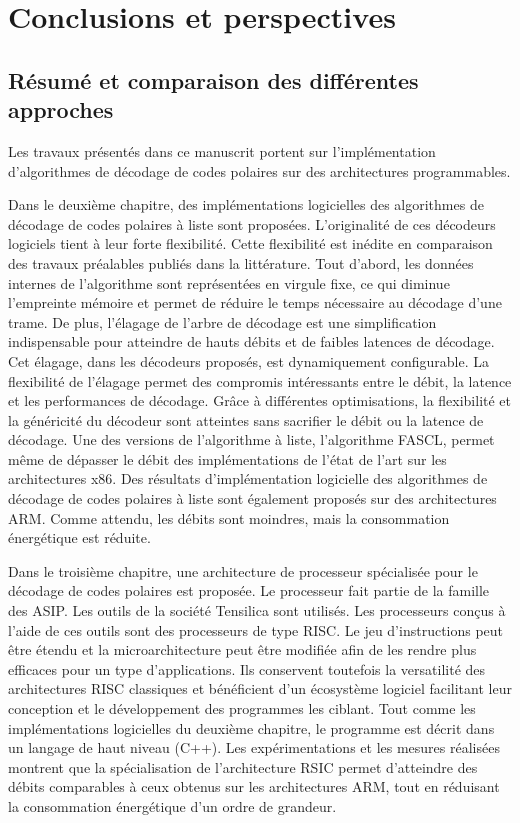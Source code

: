 \chapter*{Conclusions et perspectives}

\section*{Résumé et comparaison des différentes approches}

Les travaux présentés dans ce manuscrit portent sur l'implémentation d'algorithmes de décodage de codes polaires sur des architectures programmables.

Dans le deuxième chapitre, des implémentations logicielles des algorithmes de décodage de codes polaires à liste sont proposées. L'originalité de ces décodeurs logiciels tient à leur forte flexibilité. Cette flexibilité est inédite en comparaison des travaux préalables publiés dans la littérature. Tout d'abord, les données internes de l'algorithme sont représentées en virgule fixe, ce qui diminue l'empreinte mémoire et permet de réduire le temps nécessaire au décodage d'une trame. De plus, l'élagage de l'arbre de décodage est une simplification indispensable pour atteindre de hauts débits et de faibles latences de décodage. Cet élagage, dans les décodeurs proposés, est dynamiquement configurable. La flexibilité de l'élagage permet des compromis intéressants entre le débit, la latence et les performances de décodage. Grâce à différentes optimisations, la flexibilité et la généricité du décodeur sont atteintes sans sacrifier le débit ou la latence de décodage. Une des versions de l'algorithme à liste, l'algorithme FASCL, permet même de dépasser le débit des implémentations de l'état de l'art sur les architectures x86. Des résultats d'implémentation logicielle des algorithmes de décodage de codes polaires à liste sont également proposés sur des architectures ARM. Comme attendu, les débits sont moindres, mais la consommation énergétique est réduite.

Dans le troisième chapitre, une architecture de processeur spécialisée pour le décodage de codes polaires est proposée. Le processeur fait partie de la famille des ASIP. Les outils de la société Tensilica sont utilisés. Les processeurs conçus à l'aide de ces outils sont des processeurs de type RISC. Le jeu d'instructions peut être étendu et la microarchitecture peut être modifiée afin de les rendre plus efficaces pour un type d'applications. Ils conservent toutefois la versatilité des architectures RISC classiques et bénéficient d'un écosystème logiciel facilitant leur conception et le développement des programmes les ciblant. Tout comme les implémentations logicielles du deuxième chapitre, le programme est décrit dans un langage de haut niveau (C++). Les expérimentations et les mesures réalisées montrent que la spécialisation de l'architecture RSIC permet d'atteindre des débits comparables à ceux obtenus sur les architectures ARM, tout en réduisant la consommation énergétique d'un ordre de grandeur.

